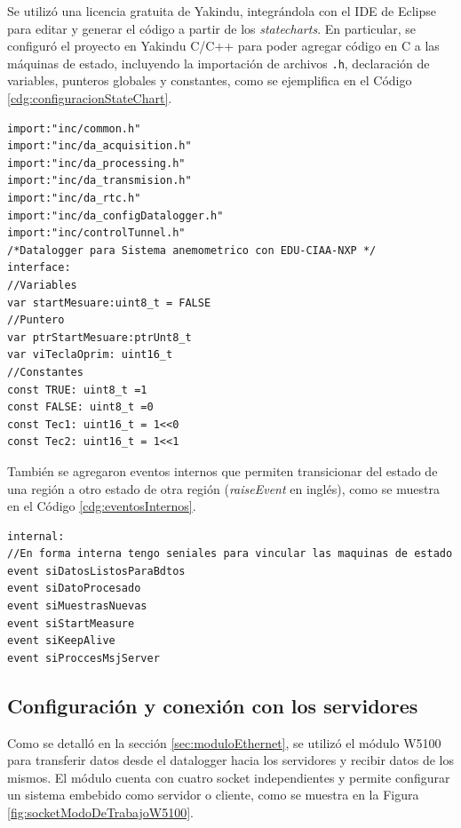 Se utilizó una licencia gratuita de Yakindu, integrándola con el IDE de Eclipse para editar y generar el código a partir de los \textit{statecharts}. En particular, se configuró el proyecto en Yakindu C/C++ para poder agregar código en C a las máquinas de estado, incluyendo la importación de archivos \texttt{.h}, declaración de variables, punteros globales y constantes, como se ejemplifica en el Código \ref{cdg:configuracionStateChart}.



\begin{lstlisting}[style=yakindustyle, caption={Configuración principal del modelo statechart dataloggerSA.}, label=cdg:configuracionStateChart]
import:"inc/common.h"
import:"inc/da_acquisition.h"
import:"inc/da_processing.h"
import:"inc/da_transmision.h"
import:"inc/da_rtc.h"
import:"inc/da_configDatalogger.h"
import:"inc/controlTunnel.h"
/*Datalogger para Sistema anemometrico con EDU-CIAA-NXP */
interface:
//Variables
var startMesuare:uint8_t = FALSE
//Puntero
var ptrStartMesuare:ptrUnt8_t
var viTeclaOprim: uint16_t
//Constantes
const TRUE: uint8_t =1
const FALSE: uint8_t =0
const Tec1: uint16_t = 1<<0
const Tec2: uint16_t = 1<<1
\end{lstlisting}
 
 También se agregaron eventos internos que permiten transicionar del estado de una región a otro estado de otra región (\textit{raiseEvent} en inglés), como se muestra en el Código \ref{cdg:eventosInternos}.
\begin{lstlisting}[style=yakindustyle, caption={Declaración de eventos internos que permiten transicionar entre regiones del statechart.}, label=cdg:eventosInternos]
internal:
//En forma interna tengo seniales para vincular las maquinas de estado
event siDatosListosParaBdtos
event siDatoProcesado
event siMuestrasNuevas
event siStartMeasure
event siKeepAlive
event siProccesMsjServer
\end{lstlisting}


\subsection{Configuración y conexión con los servidores}\label{sec:confServers}
Como se detalló en la sección \ref{sec:moduloEthernet}, se utilizó el módulo W5100 para transferir datos desde el datalogger hacia los servidores y recibir datos de los mismos. El módulo cuenta con cuatro socket independientes y permite configurar un sistema embebido como servidor o cliente, como se muestra en la Figura \ref{fig:socketModoDeTrabajoW5100}.

